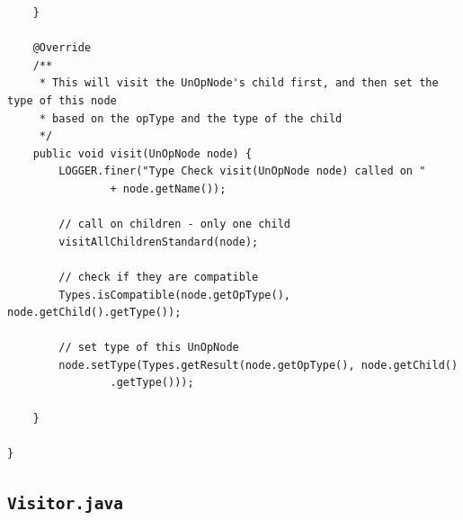 \documentclass{report}
\begin{document}
\begin{verbatim}
	}

	@Override
	/**
	 * This will visit the UnOpNode's child first, and then set the type of this node
	 * based on the opType and the type of the child
	 */
	public void visit(UnOpNode node) {
		LOGGER.finer("Type Check visit(UnOpNode node) called on "
				+ node.getName());

		// call on children - only one child
		visitAllChildrenStandard(node);

		// check if they are compatible
		Types.isCompatible(node.getOpType(), node.getChild().getType());

		// set type of this UnOpNode
		node.setType(Types.getResult(node.getOpType(), node.getChild()
				.getType()));

	}

}
\end{verbatim}

\subsection{\texttt{Visitor.java}}
\end{document}

